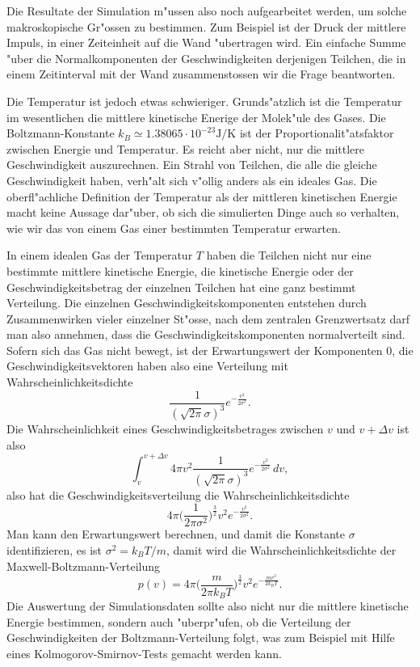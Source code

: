 Die Resultate der Simulation m"ussen also noch aufgearbeitet werden, um
solche makroskopische Gr"ossen zu bestimmen.
Zum Beispiel ist der Druck der mittlere Impuls, in einer Zeiteinheit
auf die Wand "ubertragen wird.
Ein einfache Summe "uber die Normalkomponenten der Geschwindigkeiten
derjenigen Teilchen, die in einem Zeitinterval mit der Wand zusammenstossen
wir die Frage beantworten.

Die Temperatur ist jedoch etwas schwieriger.
Grunds"atzlich ist die Temperatur im wesentlichen die mittlere 
kinetische Enerige der Molek"ule des Gases. Die Boltzmann-Konstante
$k_B\simeq 1.38065\cdot10^{-23} \text{J/K}$ ist der Proportionalit"atsfaktor
zwischen Energie und Temperatur.
Es reicht aber nicht,
nur die mittlere Geschwindigkeit auszurechnen.
Ein Strahl von Teilchen, die alle die gleiche Geschwindigkeit haben,
verh"alt sich v"ollig anders als ein ideales Gas.
Die oberfl"achliche Definition der Temperatur als der mittleren
kinetischen Energie macht keine Aussage dar"uber, ob sich die
simulierten Dinge auch so verhalten, wie wir das von einem
Gas einer bestimmten Temperatur erwarten.

In einem idealen Gas der Temperatur $T$ haben die Teilchen nicht nur
eine bestimmte mittlere kinetische Energie, die kinetische Energie
oder der Geschwindigkeitsbetrag
der einzelnen Teilchen hat eine ganz bestimmt Verteilung.
Die einzelnen Geschwindigkeitskomponenten entstehen durch Zusammenwirken
vieler einzelner St"osse, nach dem zentralen Grenzwertsatz darf man also
annehmen, dass die Geschwindigkeitskomponenten normalverteilt sind.
Sofern sich das Gas nicht bewegt, ist der Erwartungswert der Komponenten
0, die Geschwindigkeitsvektoren haben also eine Verteilung mit
Wahrscheinlichkeitsdichte
\[
\frac1{(\sqrt{2\pi}\sigma)^3}e^{-\frac{v^2}{2\sigma^2}}.
\]
Die Wahrscheinlichkeit eines Geschwindigkeitsbetrages zwischen $v$ und
$v+\Delta v$ ist also
\[
\int_v^{v+\Delta v} 4\pi v^2
\frac1{(\sqrt{2\pi}\sigma)^3}e^{-\frac{v^2}{2\sigma^2}}\,dv,
\]
also hat die Geschwindigkeitsverteilung die Wahrscheinlichkeitsdichte
\[
4\pi
\biggl(
\frac{1}{2\pi \sigma^2}
\biggr)^{\frac32}
v^2 e^{-\frac{v^2}{2\sigma^2}}.
\]
Man kann den Erwartungswert berechnen, und damit die Konstante $\sigma$
identifizieren, es ist $\sigma^2=k_BT/m$, damit wird die 
Wahrscheinlichkeitsdichte der Maxwell-Boltzmann-Verteilung
\[
p(v)=
4\pi\biggl(\frac{m}{2\pi k_BT}\biggr)^\frac32 v^2 e^{-\frac{mv^2}{2k_BT}}.
\]
Die Auswertung der Simulationsdaten sollte also nicht nur die mittlere
kinetische Energie bestimmen, sondern auch "uberpr"ufen, ob die Verteilung
der Geschwindigkeiten der Boltzmann-Verteilung folgt, was zum Beispiel mit
Hilfe eines Kolmogorov-Smirnov-Tests gemacht werden kann.

